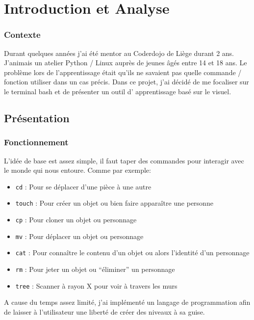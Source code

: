 \documentclass{report}
\begin{document}
\part{Introduction et Analyse}

\section*{Contexte}
Durant quelques années j’ai été mentor au Coderdojo de Liège durant 2 ans. J’animais un atelier Python / Linux auprès de jeunes âgés entre 14 et 18 ans. Le problème lors de l’apprentissage était qu’ils ne savaient pas quelle commande / fonction utiliser dans un cas précis. Dans ce projet, j’ai décidé de me focaliser sur le terminal bash et de présenter un outil d’ apprentissage basé sur le visuel.
\chapter{Présentation}
\section{Fonctionnement}
L’idée de base est assez simple, il faut taper des commandes pour interagir avec le monde qui nous entoure.
\newline
\newline
Comme par exemple:

\begin {itemize}
  \item \texttt{cd}  : Pour se déplacer d’une pièce à une autre
  \item \texttt{touch} : Pour créer un objet ou bien faire apparaître une personne
  \item \texttt{cp} : Pour cloner un objet ou personnage
  \item \texttt{mv} : Pour déplacer un objet ou personnage
  \item \texttt{cat} : Pour connaître le contenu d’un objet ou alors l'identité d’un personnage
  \item \texttt{rm} : Pour jeter un objet ou “éliminer” un personnage
  \item \texttt{tree} : Scanner à rayon X pour voir à travers les murs
\end {itemize}

A cause du temps assez limité, j'ai implémenté un langage de programmation afin de laisser à l'utilisateur une liberté de créer des niveaux à sa guise.
\newpage
\end{document}
